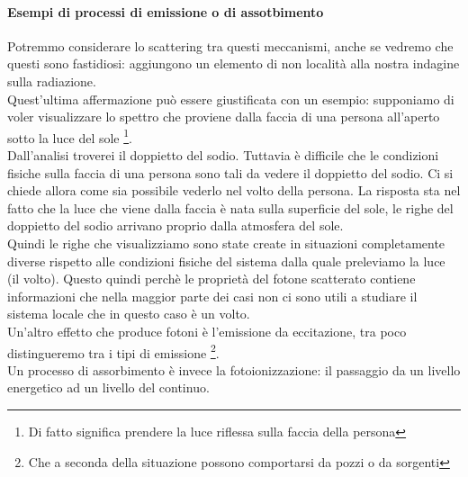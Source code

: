 \paragraph{Esempi di processi di emissione o di assotbimento}%
Potremmo considerare lo scattering tra questi meccanismi, anche se vedremo che questi sono fastidiosi: aggiungono un elemento di non località alla nostra indagine sulla radiazione.\\ 
Quest'ultima affermazione può essere giustificata con un esempio: supponiamo di voler visualizzare lo spettro che proviene dalla faccia di una persona all'aperto sotto la luce del sole \footnote{Di fatto significa prendere la luce riflessa sulla faccia della persona}. \\
Dall'analisi troverei il doppietto del sodio. Tuttavia è difficile che le condizioni fisiche sulla faccia di una persona sono tali da vedere il doppietto del sodio. Ci si chiede allora come sia possibile vederlo nel volto della persona. La risposta sta nel fatto che la luce che viene dalla faccia è nata sulla superficie del sole, le righe del doppietto del sodio arrivano proprio dalla atmosfera del sole.\\
Quindi le righe che visualizziamo sono state create in situazioni completamente diverse rispetto alle condizioni fisiche del sistema dalla quale preleviamo la luce (il volto). Questo quindi perchè le proprietà del fotone scatterato contiene informazioni che nella maggior parte dei casi non ci sono utili a studiare il sistema locale che in questo caso è un volto.\\
Un'altro effetto che produce fotoni è l'emissione da eccitazione, tra poco distingueremo tra i tipi di emissione \footnote{Che a seconda della situazione possono comportarsi da pozzi o da sorgenti}. \\
Un processo di assorbimento è invece la  fotoionizzazione: il passaggio da un livello energetico ad un livello del continuo.\\
